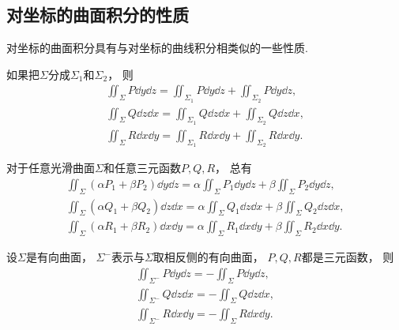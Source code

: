 \subsection{对坐标的曲面积分的性质}
对坐标的曲面积分具有与对坐标的曲线积分相类似的一些性质.
\begin{property}
如果把\(\Sigma\)分成\(\Sigma_1\)和\(\Sigma_2\)，
则\begin{gather}
	\iint_\Sigma P\dd{y}\dd{z}
	=\iint_{\Sigma_1} P\dd{y}\dd{z}
	+\iint_{\Sigma_2} P\dd{y}\dd{z}, \\
	\iint_\Sigma Q\dd{z}\dd{x}
	=\iint_{\Sigma_1} Q\dd{z}\dd{x}
	+\iint_{\Sigma_2} Q\dd{z}\dd{x}, \\
	\iint_\Sigma R\dd{x}\dd{y}
	=\iint_{\Sigma_1} R\dd{x}\dd{y}
	+\iint_{\Sigma_2} R\dd{x}\dd{y}.
\end{gather}
\end{property}

\begin{property}
对于任意光滑曲面\(\Sigma\)和任意三元函数\(P,Q,R\)，
总有\begin{gather}
	\iint_\Sigma (\alpha P_1 + \beta P_2) \dd{y}\dd{z}
	= \alpha \iint_\Sigma P_1 \dd{y}\dd{z}
	+ \beta \iint_\Sigma P_2 \dd{y}\dd{z}, \\
	\iint_\Sigma (\alpha Q_1 + \beta Q_2) \dd{z}\dd{x}
	= \alpha \iint_\Sigma Q_1 \dd{z}\dd{x}
	+ \beta \iint_\Sigma Q_2 \dd{z}\dd{x}, \\
	\iint_\Sigma (\alpha R_1 + \beta R_2) \dd{x}\dd{y}
	= \alpha \iint_\Sigma R_1 \dd{x}\dd{y}
	+ \beta \iint_\Sigma R_2 \dd{x}\dd{y}.
\end{gather}
\end{property}

\begin{property}
设\(\Sigma\)是有向曲面，
\(\Sigma^-\)表示与\(\Sigma\)取相反侧的有向曲面，
\(P,Q,R\)都是三元函数，
则\begin{gather}
	\iint_{\Sigma^-} P \dd{y}\dd{z}
	= -\iint_\Sigma P \dd{y}\dd{z}, \\
	\iint_{\Sigma^-} Q \dd{z}\dd{x}
	= -\iint_\Sigma Q \dd{z}\dd{x}, \\
	\iint_{\Sigma^-} R \dd{x}\dd{y}
	= -\iint_\Sigma R \dd{x}\dd{y}.
\end{gather}
\end{property}

